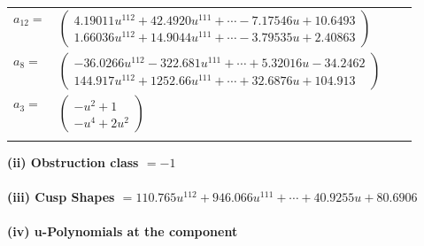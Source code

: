 \documentclass[1p]{elsarticle_modified}
\theoremstyle{definition}
\begin{document}
\begin{tabular}{m{7pt} m{180pt} m{7pt} m{180pt} }
\flushright $a_{12}=$&$\begin{pmatrix}4.19011 u^{112}+42.4920 u^{111}+\cdots-7.17546 u+10.6493\\1.66036 u^{112}+14.9044 u^{111}+\cdots-3.79535 u+2.40863\end{pmatrix}$ \\
\flushright $a_{8}=$&$\begin{pmatrix}-36.0266 u^{112}-322.681 u^{111}+\cdots+5.32016 u-34.2462\\144.917 u^{112}+1252.66 u^{111}+\cdots+32.6876 u+104.913\end{pmatrix}$ \\
\flushright $a_{3}=$&$\begin{pmatrix}- u^2+1\\- u^4+2 u^2\end{pmatrix}$\\&\end{tabular}
\flushleft \textbf{(ii) Obstruction class $= -1$}\\~\\
\flushleft \textbf{(iii) Cusp Shapes $= 110.765 u^{112}+946.066 u^{111}+\cdots+40.9255 u+80.6906$}\\~\\
\newpage\renewcommand{\arraystretch}{1}
\flushleft \textbf{(iv) u-Polynomials at the component}\newline \\
\end{document}
